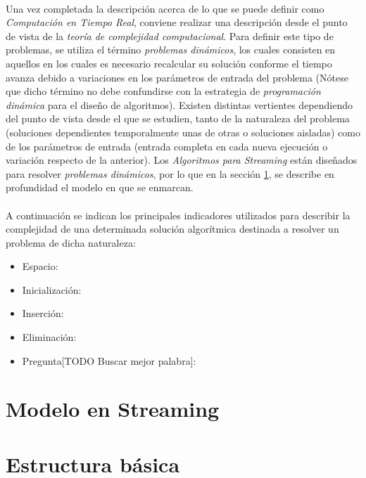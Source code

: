 \documentclass{subfiles}
\begin{document}
        \paragraph{}
        Una vez completada la descripción acerca de lo que se puede definir como \emph{Computación en Tiempo Real}, conviene realizar una descripción desde el punto de vista de la \emph{teoría de complejidad computacional}. Para definir este tipo de problemas, se utiliza el término \emph{problemas dinámicos}, los cuales consisten en aquellos en los cuales es necesario recalcular su solución conforme el tiempo avanza debido a variaciones en los parámetros de entrada del problema (Nótese que dicho término no debe confundirse con la estrategia de \emph{programación dinámica} para el diseño de algoritmos). Existen distintas vertientes dependiendo del punto de vista desde el que se estudien, tanto de la naturaleza del problema (soluciones dependientes temporalmente unas de otras o soluciones aisladas) como de los parámetros de entrada (entrada completa en cada nueva ejecución o variación respecto de la anterior). Los \emph{Algoritmos para Streaming} están diseñados para resolver \emph{problemas dinámicos}, por lo que en la sección \ref{sec:streaming-model}, se describe en profundidad el modelo en que se enmarcan.

        \paragraph{}
        A continuación se indican los principales indicadores utilizados para describir la complejidad de una determinada solución algorítmica destinada a resolver un problema de dicha naturaleza:

        \begin{itemize}
          \item Espacio:
          \item Inicialización:
          \item Inserción:
          \item Eliminación:
          \item Pregunta[TODO Buscar mejor palabra]:
        \end{itemize}

    \section{Modelo en Streaming}
    \label{sec:streaming-model}

      \paragraph{}

    \section{Estructura básica}
    \label{sec:streaming-structure}

      \paragraph{}
\end{document}
